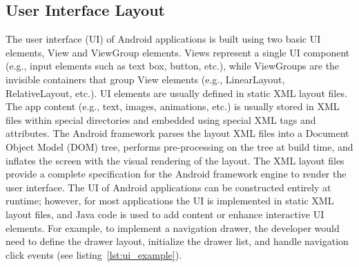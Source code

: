 \subsection{User Interface Layout}
The user interface (UI) of Android applications is built using two basic UI elements, View and ViewGroup elements.
Views represent a single UI component (e.g., input elements such as text box, button, etc.), while ViewGroups are the invisible containers that group View elements (e.g., LinearLayout, RelativeLayout, etc.).
UI elements are usually defined in static XML layout files. The app content (e.g., text, images, animations, etc.) is usually stored in XML files within special directories and embedded using special XML tags and attributes.
The Android framework parses the layout XML files into a Document Object Model (DOM) tree, performs pre-processing on the tree at build time, and inflates the screen with the visual rendering of the layout.
The XML layout files provide a complete specification for the Android framework engine to render the user interface.
The UI of Android applications can be constructed entirely at runtime; however, for most applications the UI is implemented in static XML layout files, and Java code is used to add content or enhance interactive UI elements.
For example, to implement a navigation drawer, the developer would need to define the drawer layout, initialize the drawer list, and handle navigation click events (see listing~\ref{lst:ui_example}).

